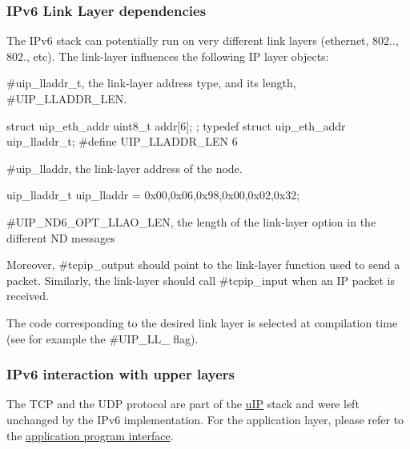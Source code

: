 \hypertarget{a00061_l2}{}\subsubsection{\-I\-Pv6 Link Layer dependencies}\label{a00061_l2}
\-The \-I\-Pv6 stack can potentially run on very different link layers (ethernet, 802.., 802., etc). \-The link-\/layer influences the following \-I\-P layer objects\-: \begin{DoxyItemize}
\item \#uip\-\_\-lladdr\-\_\-t, the link-\/layer address type, and its length, \#\-U\-I\-P\-\_\-\-L\-L\-A\-D\-D\-R\-\_\-\-L\-E\-N. 
\begin{DoxyCode}
struct uip_eth_addr {
  uint8_t addr[6];
};
typedef struct uip_eth_addr uip_lladdr_t;
#define UIP_LLADDR_LEN 6
\end{DoxyCode}
 \item \#uip\-\_\-lladdr, the link-\/layer address of the node. 
\begin{DoxyCode}
uip_lladdr_t uip_lladdr = {{0x00,0x06,0x98,0x00,0x02,0x32}};
\end{DoxyCode}
 \item \#\-U\-I\-P\-\_\-\-N\-D6\-\_\-\-O\-P\-T\-\_\-\-L\-L\-A\-O\-\_\-\-L\-E\-N, the length of the link-\/layer option in the different \-N\-D messages\end{DoxyItemize}
\-Moreover, \#tcpip\-\_\-output should point to the link-\/layer function used to send a packet. \-Similarly, the link-\/layer should call \#tcpip\-\_\-input when an \-I\-P packet is received.

\-The code corresponding to the desired link layer is selected at compilation time (see for example the \#\-U\-I\-P\-\_\-\-L\-L\-\_ flag).



\hypertarget{a00061_l45}{}\subsubsection{\-I\-Pv6 interaction with upper layers}\label{a00061_l45}
\-The \-T\-C\-P and the \-U\-D\-P protocol are part of the \hyperlink{a00060}{u\-I\-P} stack and were left unchanged by the \-I\-Pv6 implementation. \-For the application layer, please refer to the \hyperlink{a00060_api}{application program interface}.



